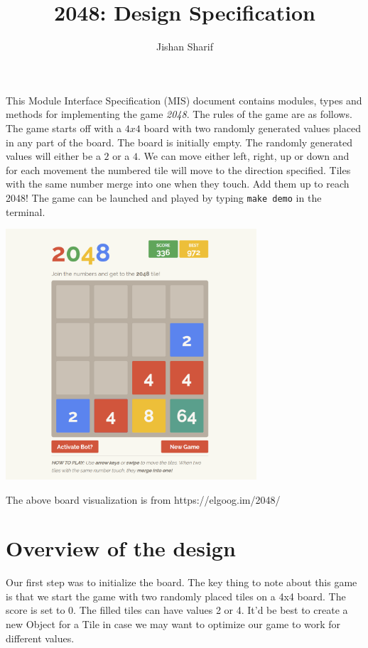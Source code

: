 \documentclass[12pt]{article}
\title{2048: Design Specification}
\author{Jishan Sharif}
\begin{document}
\maketitle
This Module Interface Specification (MIS) document contains modules, types and
methods for implementing the game \textit{2048}. The rules of the game are as follows. 
The game starts off with a $4x4$ board with two randomly generated values placed in any part of the board. The board is initially empty. The randomly generated values will either be a $2$ or a $4$. We can move either left, right, up or down and for each movement the numbered tile will move to the direction specified. Tiles with the same number merge into one when they touch. Add them up to reach 2048! The game can be launched and played by typing \texttt{make demo} in the terminal.


\begin{center}
  \includegraphics[width=0.7\textwidth]{2048-game.png}

  The above board visualization is from https://elgoog.im/2048/
\end{center}

\newpage

\section{Overview of the design}

Our first step was to initialize the board. The key thing to note about this game is
that we start the game with two randomly placed tiles on a 4x4 board. The score is set to 0.
The filled tiles can have values 2 or 4. It'd be best to create a new Object for a Tile in case we may want to optimize our game to work for different values.
\end{document}
